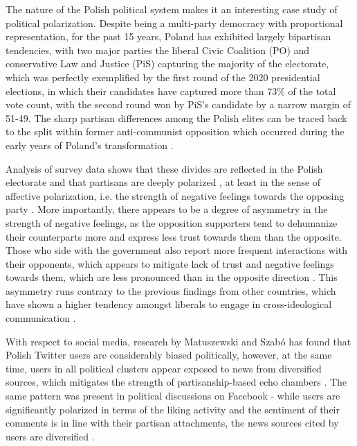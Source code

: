 \documentclass{article}
\begin{document}
	The nature of the Polish political system makes it an interesting case study of political polarization. Despite being a multi-party democracy with proportional representation, for the past 15 years, Poland has exhibited largely bipartisan tendencies, with two major parties the liberal Civic Coalition (PO) and conservative Law and Justice (PiS) capturing the majority of the electorate, which was perfectly exemplified by the first round of the 2020 presidential elections, in which their candidates have captured more than 73\% of the total vote count, with the second round won by PiS’s candidate by a narrow margin of 51-49. The sharp partisan differences among the Polish elites can be traced back to the split within former anti-communist opposition which occurred during the early years of Poland’s transformation \citep{baylis2012}. 
	
	Analysis of survey data shows that these divides are reflected in the Polish electorate and that partisans are deeply polarized \citep{gorska2019}, at least in the sense of affective polarization, i.e. the strength of negative feelings towards the opposing party \citep{iyengar2012}. More importantly, there appears to be a degree of asymmetry in the strength of negative feelings, as the opposition supporters tend to dehumanize their counterparts more and express less trust towards them than the opposite. Those who side with the government also report more frequent interactions with their opponents, which appears to mitigate lack of trust and negative feelings towards them, which are less pronounced than in the opposite direction \citep{gorska2019}. This asymmetry runs contrary to the previous findings from other countries, which have shown a higher tendency amongst liberals to engage in cross-ideological communication \citep{barbera2015_2}.
	
	With respect to social media, research by Matuszewski and Szabó has found that Polish Twitter users are considerably biased politically, however, at the same time, users in all political clusters appear exposed to news from diversified sources, which mitigates the strength of partisanship-based echo chambers \citep{matuszewski2019}. The same pattern was present in political discussions on Facebook - while users are significantly polarized in terms of the liking activity and the sentiment of their comments is in line with their partisan attachments, the news sources cited by users are diversified \citep{matuszewski2018}.
	
\end{document}
